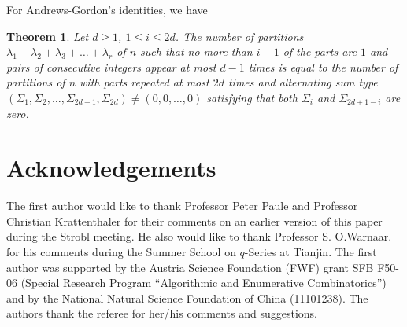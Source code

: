 \documentclass[11pt]{article}
\newtheorem{theorem}{Theorem}[section]
\begin{document}
For Andrews-Gordon's identities, we have 
\begin{theorem}
Let $d\geq 1$, $1\leq i\leq 2d$.
 The number of partitions $\lambda_{1}+\lambda_{2}+\lambda_{3}+\dots+\lambda_{r}$ of $n$ such that no more than $i-1$ of the parts are $1$ and pairs of consecutive integers appear at most $d-1$
 times is equal to the number of partitions of $n$ with parts repeated  at most $2d$ times and alternating sum type $(\Sigma_{1},\Sigma_{2},\dots,\Sigma_{2d-1},\Sigma_{2d})\neq(0,0,\dots,0)$ satisfying that both $\Sigma_{i}$ and $\Sigma_{2d+1-i}$ are zero.
\end{theorem}

\section*{Acknowledgements}
The first author would like to thank Professor Peter Paule and Professor Christian Krattenthaler for their comments on an earlier version of this paper during the Strobl meeting.  He also would like to thank Professor S. O.Warnaar. for his comments during the Summer School on $q$-Series at Tianjin.  The first author was supported  by the Austria Science Foundation (FWF) grant SFB F50-06 (Special Research Program ``Algorithmic and Enumerative Combinatorics'') and  by the National Natural Science Foundation of China (11101238). The authors thank the referee for her/his comments and suggestions.
\end{document}
